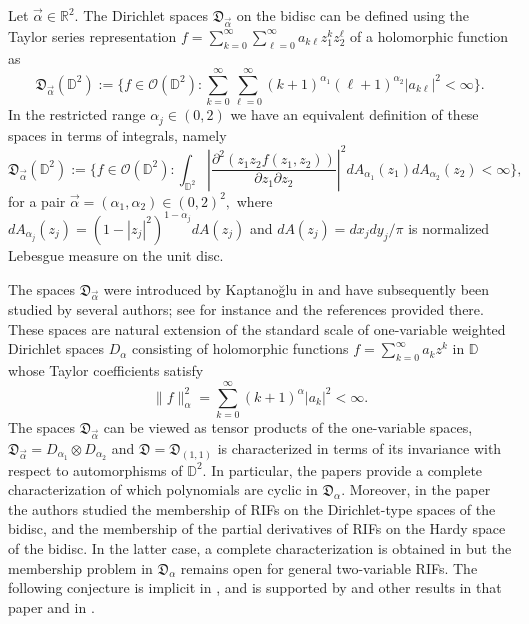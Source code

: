\documentclass[11pt]{amsart}
\numberwithin{equation}{section}
\begin{document}
Let $\vec{\alpha}\in\mathbb{R}^2.$ The Dirichlet spaces $\mathfrak{D}_{\vec{\alpha}}$ on the bidisc can be defined 
using the Taylor series representation $f=\sum_{k=0}^{\infty}\sum_{\ell=0}^{\infty}a_{k\ell}z_1^kz_2^{\ell}$ of a holomorphic function  as
$$\mathfrak{D}_{\vec{\alpha}}(\mathbb{D}^2):=\Biggl\{ f\in \mathcal{O}(\mathbb{D}^2):\sum_{k=0}^{\infty}\sum_{\ell=0}^{\infty}(k+1)^{\alpha_1}(\ell+1)^{\alpha_2}|a_{k\ell}|^2<\infty\Biggr\}.$$
In the restricted range $\alpha_j\in(0,2)$ we have an equivalent definition of these spaces in terms of integrals, namely
\[\mathfrak{D}_{\vec{\alpha}}(\mathbb{D}^2):=\Biggl\{ f\in \mathcal{O}(\mathbb{D}^2):\int_{\mathbb{D}^2}\left|\frac{\partial^2(z_1z_2f(z_1,z_2))}{\partial z_1 \partial z_2}\right|^2dA_{\alpha_1}(z_1)dA_{\alpha_2}(z_2)<\infty\Biggr\},\] 
for a pair $\vec{\alpha}=(\alpha_1,\alpha_2)\in(0,2)^2,$ where
$dA_{\alpha_j}(z_j)=(1-|z_j|^2)^{1-\alpha_j}dA(z_j)$ and $dA(z_j)=dx_jdy_j/\pi$ is normalized Lebesgue measure on the unit disc.


The spaces $\mathfrak{D}_{\vec{\alpha}}$ were introduced by Kaptano\u{g}lu in \cite{Kaptanoglu} and have subsequently been studied by several authors; see for instance \cite{JP,Perfekt,Arcoetal} and the references provided there. These spaces are natural extension of the standard scale of one-variable weighted Dirichlet spaces $D_{\alpha}$ consisting of holomorphic functions $f=\sum_{k=0}^{\infty}a_kz^k$ in $\mathbb{D}$ whose Taylor coefficients satisfy
\[\|f\|^2_{\alpha}=\sum_{k=0}^{\infty}(k+1)^{\alpha}|a_k|^2<\infty.\] 
The spaces $\mathfrak{D}_{\vec{\alpha}}$ can be viewed as tensor products of the one-variable spaces, $\mathfrak{D}_{\vec{\alpha}}=D_{\alpha_1}\otimes D_{\alpha_2}$ and $\mathfrak{D}=\mathfrak{D}_{(1,1)}$ is characterized in terms of its invariance with respect to automorphisms of $\mathbb{D}^2$. In particular, the papers \cite{Cyclicity1, Cyclicity2} provide a complete characterization of which polynomials are cyclic in $\mathfrak{D}_{\alpha}$. Moreover, in the paper \cite{PLMS} the authors studied the membership of RIFs on the Dirichlet-type spaces of the bidisc, and the membership of the partial derivatives of RIFs on the Hardy space of the bidisc. In the latter case, a complete characterization is obtained in \cite{PLMS} but the membership problem in $\mathfrak{D}_{\alpha}$ remains open for general two-variable RIFs. The following conjecture is implicit in \cite{PLMS}, and is supported by \cite[Theorem 10.2]{PLMS} and other results in that paper and in \cite{Bergqvist}. 
\end{document}
